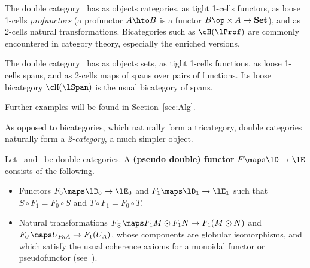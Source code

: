 \begin{eg}
  The double category \lProf\ has as objects categories, as
  tight 1-cells functors, as loose 1-cells \emph{profunctors} (a profunctor
  $A\hto B$ is a functor $B\op\times A\to \mathbf{Set}$), and as
  2-cells natural transformations.  Bicategories such as
  $\cH(\lProf)$ are commonly encountered in category theory,
  especially the enriched versions.
\end{eg}

\begin{eg}
  The double category \lSpan\ has as objects sets, as tight 1-cells functions, as loose 1-cells spans, and as 2-cells maps of spans over pairs of functions.  Its loose bicategory $\cH(\lSpan)$ is the usual bicategory of spans.
\end{eg}

Further examples will be found in Section~\ref{sec:Alg}.


As opposed to bicategories, which naturally form a tricategory, double
categories naturally form a \emph{2-category}, a much simpler object.

\begin{defn}
  Let \lD\ and \lE\ be double categories.  A \textbf{(pseudo double)
    functor} $F \maps \lD\to \lE$ consists of the following.
  \begin{itemize}
  \item Functors $F_0\maps \lD_0 \to \lE_0$ and $F_1\maps \lD_1 \to
    \lE_1$ such that $S\circ F_1 = F_0\circ S$ and $T\circ F_1 =
    F_0\circ T$.
  \item Natural transformations $F_\odot\maps F_1M \odot F_1N \to
    F_1(M\odot N)$ and $F_U\maps U_{F_0 A} \to F_1(U_A)$, whose
    components are globular isomorphisms, and which satisfy the usual
    coherence axioms for a monoidal functor or pseudofunctor
    (see~\cite[\S{}XI.2]{maclane}).
  \end{itemize}
\end{defn}

